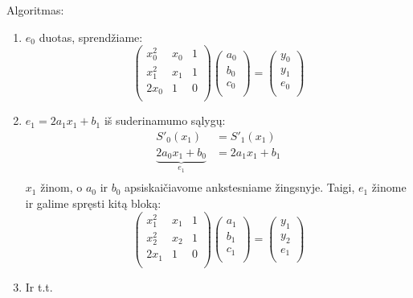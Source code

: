 
Algoritmas:
\begin{enumerate}
  \item $e_{0}$ duotas, sprendžiame:
    \begin{equation*}
      \begin{pmatrix}
        x_{0}^{2} & x_{0} & 1 \\
        x_{1}^{2} & x_{1} & 1 \\
        2x_{0} & 1 & 0 \\
      \end{pmatrix}
      \begin{pmatrix}
        a_{0} \\
        b_{0} \\
        c_{0} \\
      \end{pmatrix}
      =
      \begin{pmatrix}
        y_{0} \\
        y_{1} \\
        e_{0} \\
      \end{pmatrix}
    \end{equation*}
  \item $e_{1} = 2a_{1}x_{1} + b_{1}$ iš suderinamumo sąlygų:
    \begin{align*}
      S'_{0}(x_{1}) &= S'_{1}(x_{1}) \\
      \underbrace{2a_{0}x_{1} + b_{0}}_{e_{1}} &= 2a_{1}x_{1} + b_{1} \\
    \end{align*}
    $x_{1}$ žinom, o $a_{0}$ ir $b_{0}$ apsiskaičiavome ankstesniame
    žingsnyje. Taigi, $e_{1}$ žinome ir galime spręsti kitą bloką:
    \begin{equation*}
      \begin{pmatrix}
        x_{1}^{2} & x_{1} & 1 \\
        x_{2}^{2} & x_{2} & 1 \\
        2x_{1} & 1 & 0 \\
      \end{pmatrix}
      \begin{pmatrix}
        a_{1} \\
        b_{1} \\
        c_{1} \\
      \end{pmatrix}
      =
      \begin{pmatrix}
        y_{1} \\
        y_{2} \\
        e_{1} \\
      \end{pmatrix}
    \end{equation*}
  \item Ir t.t.
\end{enumerate}

